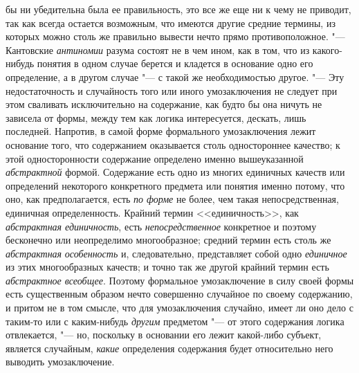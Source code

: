 {{бы ни убедительна была ее правильность, это все же еще ни к чему не
приводит, так как всегда остается возможным, что имеются другие средние
термины, из которых можно столь же правильно вывести нечто прямо
противоположное. "--- Кантовские
{\em антиномии} разума
состоят не в чем ином, как в том, что из какого-нибудь понятия в одном
случае берется и кладется в основание одно его определение, а в другом
случае "--- с такой же необходимостью другое. "---
Эту недостаточность и случайность того или иного
умозаключения не следует при этом сваливать исключительно на содержание,
как будто бы она ничуть не зависела от формы, между тем как логика
интересуется, дескать, лишь последней. Напротив, в самой форме формального
умозаключения лежит основание того, что содержанием оказывается столь
одностороннее качество; к этой односторонности содержание определено именно
вышеуказанной {\em абстрактной}
формой. Содержание есть одно из многих единичных качеств или
определений некоторого конкретного предмета или понятия именно потому, что
оно, как предполагается, есть {\em по
форме} не более, чем такая непосредственная, единичная
определенность. Крайний термин <<единичность>>, как
{\em абстрактная единичность},
есть
{\em непосредственное}
конкретное и поэтому бесконечно или неопределимо
многообразное; средний термин есть столь же
{\em абстрактная
}{\em особенность} и,
следовательно, представляет собой одно
{\em единичное} из этих
многообразных качеств; и точно так же другой крайний термин есть
{\em абстрактное всеобщее}.
Поэтому формальное умозаключение в силу своей формы есть
существенным образом нечто совершенно случайное по своему содержанию, и
притом не в том смысле, что для умозаключения случайно, имеет ли оно дело с
таким-то или с каким-нибудь
{\em другим} предметом
"--- от этого содержания логика отвлекается, "---
но, поскольку в основании его лежит какой-либо субъект,
является случайным, {\em какие}
определения содержания будет относительно него выводить
умозаключение.

}}

